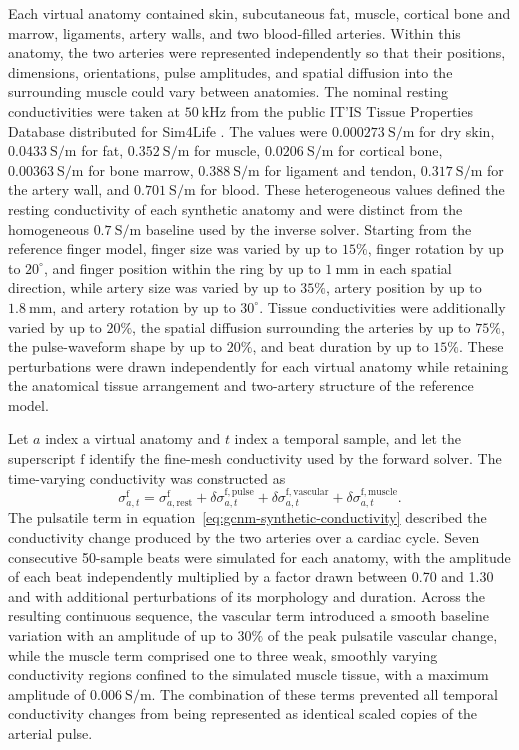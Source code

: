 \documentclass[11pt]{article}
\begin{document}
Each virtual anatomy contained skin, subcutaneous fat, muscle, cortical bone and marrow, ligaments, artery walls, and two blood-filled arteries.
Within this anatomy, the two arteries were represented independently so that their positions, dimensions, orientations, pulse amplitudes, and spatial diffusion into the surrounding muscle could vary between anatomies.
\begingroup
\color{red}
The nominal resting conductivities were taken at $50~\mathrm{kHz}$ from the public IT'IS Tissue Properties Database distributed for Sim4Life \cite{ITIS2024}.
The values were $0.000273~\mathrm{S/m}$ for dry skin, $0.0433~\mathrm{S/m}$ for fat, $0.352~\mathrm{S/m}$ for muscle, $0.0206~\mathrm{S/m}$ for cortical bone, $0.00363~\mathrm{S/m}$ for bone marrow, $0.388~\mathrm{S/m}$ for ligament and tendon, $0.317~\mathrm{S/m}$ for the artery wall, and $0.701~\mathrm{S/m}$ for blood.
These heterogeneous values defined the resting conductivity of each synthetic anatomy and were distinct from the homogeneous $0.7~\mathrm{S/m}$ baseline used by the inverse solver.
\endgroup
Starting from the reference finger model, finger size was varied by up to $15\%$, finger rotation by up to $20^\circ$, and finger position within the ring by up to $1~\mathrm{mm}$ in each spatial direction, while artery size was varied by up to $35\%$, artery position by up to $1.8~\mathrm{mm}$, and artery rotation by up to $30^\circ$.
Tissue conductivities were additionally varied by up to $20\%$, the spatial diffusion surrounding the arteries by up to $75\%$, the pulse-waveform shape by up to $20\%$, and beat duration by up to $15\%$.
These perturbations were drawn independently for each virtual anatomy while retaining the anatomical tissue arrangement and two-artery structure of the reference model.

Let $a$ index a virtual anatomy and $t$ index a temporal sample, and let the superscript $\mathrm f$ identify the fine-mesh conductivity used by the forward solver.
The time-varying conductivity was constructed as
\begin{equation}
    \sigma^{\mathrm f}_{a,t}
    =
    \sigma^{\mathrm f}_{a,\mathrm{rest}}
    +\delta\sigma^{\mathrm f,\mathrm{pulse}}_{a,t}
    +\delta\sigma^{\mathrm f,\mathrm{vascular}}_{a,t}
    +\delta\sigma^{\mathrm f,\mathrm{muscle}}_{a,t}.
\label{eq:gcnm-synthetic-conductivity}
\end{equation}
The pulsatile term in equation~\eqref{eq:gcnm-synthetic-conductivity} described the conductivity change produced by the two arteries over a cardiac cycle.
Seven consecutive 50-sample beats were simulated for each anatomy, with the amplitude of each beat independently multiplied by a factor drawn between 0.70 and 1.30 and with additional perturbations of its morphology and duration.
Across the resulting continuous sequence, the vascular term introduced a smooth baseline variation with an amplitude of up to $30\%$ of the peak pulsatile vascular change, while the muscle term comprised one to three weak, smoothly varying conductivity regions confined to the simulated muscle tissue, with a maximum amplitude of $0.006~\mathrm{S/m}$.
The combination of these terms prevented all temporal conductivity changes from being represented as identical scaled copies of the arterial pulse.
\end{document}
